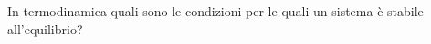\question  In termodinamica quali sono le condizioni per le quali un sistema è stabile all'equilibrio?
